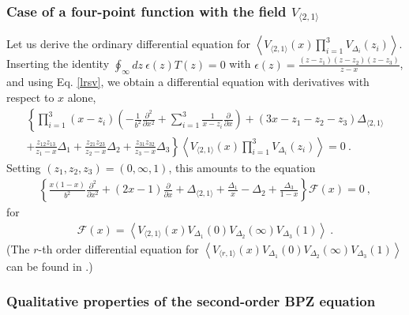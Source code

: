 \documentclass[12pt, a4paper, notitlepage, twoside]{report}
\numberwithin{equation}{section}
\theoremstyle{break}
\begin{document}
\subsubsection{Case of a four-point function with the field $V_{\langle 2,1 \rangle}$}

Let us derive the ordinary differential equation for $\left\langle V_{\langle 2,1 \rangle}(x)\prod_{i=1}^3 V_{\Delta_i}(z_i)\right\rangle$.
Inserting the identity $\oint_\infty dz\ \epsilon(z) T(z) =0$ with $\epsilon(z) = \frac{(z-z_1)(z-z_2)(z-z_3)}{z-x}$, and using Eq. \eqref{lrsv}, we obtain a differential equation with derivatives with respect to $x$ alone, 
\begin{multline}
  \left\{ \prod_{i=1}^3(x-z_i)\left(-\frac{1}{b^2}\frac{\partial^2}{\partial x^2} +\sum_{i=1}^3 \frac{1}{x-z_i} {\frac{\partial}{\partial x}} \right) + (3x-z_1-z_2-z_3)\Delta_{\langle 2,1 \rangle} \right.
  \\
\left.  +\frac{z_{12}z_{13}}{z_1-x}\Delta_1 + \frac{z_{21}z_{23}}{z_2-x}\Delta_2+\frac{z_{31}z_{32}}{z_3-x}\Delta_3\right\} 
\left\langle V_{\langle 2,1 \rangle}(x)\prod_{i=1}^3 V_{\Delta_i}(z_i)\right\rangle  = 0\ .
\label{uode}
\end{multline}
Setting $(z_1,z_2,z_3)=(0,\infty,1)$, this amounts to the equation 
\begin{align}
  \left\{ \frac{x(1-x)}{b^2}\frac{\partial^2}{\partial x^2} + (2x-1){\frac{\partial}{\partial x}} +\Delta_{\langle 2,1 \rangle} +\frac{\Delta_1}{x}-\Delta_2 + \frac{\Delta_3}{1-x}\right\} \mathcal{F}(x)=0\ ,
\label{sode}
\end{align}
for 
\begin{align}
 \mathcal{F}(x) = \left\langle V_{\langle 2,1 \rangle}(x)V_{\Delta_1}(0)V_{\Delta_2}(\infty)V_{\Delta_3}(1)\right\rangle\ .
\label{fxv}
 \end{align}
(The $r$-th order differential equation for $\left\langle V_{\langle r,1 \rangle}(x)V_{\Delta_1}(0)V_{\Delta_2}(\infty)V_{\Delta_3}(1)\right\rangle $ can be found in \cite{flno09}.)

\subsubsection{Qualitative properties of the second-order BPZ equation}
\end{document}
